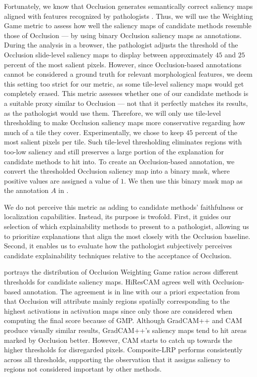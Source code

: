 Fortunately, we know that Occlusion generates semantically correct saliency maps aligned with features recognized by pathologists \cite{gallo}.
Thus, we will use the Weighting Game metric to assess how well the saliency maps of candidate methods resemble those of Occlusion --- by using binary Occlusion saliency maps as annotations.
During the analysis in a browser, the pathologist adjusts the threshold of the Occlusion slide-level saliency maps to display between approximately $45$ and $25$ percent of the most salient pixels.
However, since Occlusion-based annotations cannot be considered a ground truth for relevant morphological features, we deem this setting too strict for our metric, as some tile-level saliency maps would get completely erased.
This metric assesses whether one of our candidate methods is a suitable proxy similar to Occlusion --- not that it perfectly matches its results, as the pathologist would use them.
Therefore, we will only use tile-level thresholding to make Occlusion saliency maps more conservative regarding how much of a tile they cover.
Experimentally, we chose to keep $45$ percent of the most salient pixels per tile.
Such tile-level thresholding eliminates regions with too-low saliency and still preserves a large portion of the explanation for candidate methods to hit into.
To create an Occlusion-based annotation, we convert the thresholded Occlusion saliency map into a binary mask, where positive values are assigned a value of $1$.
We then use this binary mask map as the annotation $A$ in .

We do not perceive this metric as adding to candidate methods' faithfulness or localization capabilities.
Instead, its purpose is twofold.
First, it guides our selection of which explainability methods to present to a pathologist, allowing us to prioritize explanations that align the most closely with the Occlusion baseline.
Second, it enables us to evaluate how the pathologist subjectively perceives candidate explainability techniques relative to the acceptance of Occlusion.

 portrays the distribution of Occlusion Weighting Game ratios across different thresholds for candidate saliency maps.
HiResCAM agrees well with Occlusion-based annotation.
The agreement is in line with our a priori expectation from  that Occlusion will attribute mainly regions spatially corresponding to the highest activations in activation maps since only those are considered when computing the final score because of GMP.
Although GradCAM++ and CAM produce visually similar results, GradCAM++'s saliency maps tend to hit areas marked by Occlusion better.
However, CAM starts to catch up towards the higher thresholds for disregarded pixels.
Composite-LRP performs consistently across all thresholds, supporting the observation that it assigns saliency to regions not considered important by other methods.

